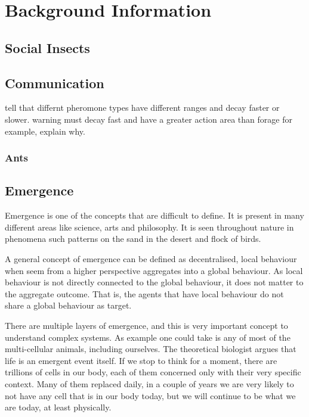 \chapter{Background Information}
\label{ch:background-information}

\section {Social Insects}

\section {Communication}
\label{sec:ant-comm}

tell that differnt pheromone types have different ranges and decay faster or slower.
warning must decay fast and have a greater action area than forage for example, explain why.

\subsection{Ants}



\section{Emergence}

Emergence is one of the concepts that are difficult to define. It is present in many different areas like science, arts and philosophy. It is seen throughout nature in phenomena such patterns on the sand in the desert and flock of birds.

A general concept of emergence can be defined as decentralised, local behaviour when seem from a higher perspective aggregates into a global behaviour. As local behaviour is not directly connected to the global behaviour, it does not matter to the aggregate outcome. That is, the agents that have local behaviour do not share a global behaviour as target.

There are multiple layers of emergence, and this is very important concept to understand complex systems.\cite{miller2007complex} As example one could take is any of most of the multi-cellular animals, including ourselves. The theoretical biologist \citeauthor{life1010034} argues that life is an emergent event itself. If we stop to think for a moment, there are trillions of cells in our body, each of them concerned only with their very specific context. Many of  them replaced daily, in a couple of years we are very likely to not have any cell that is in our body today, but we will continue to be what we are today, at least physically.

